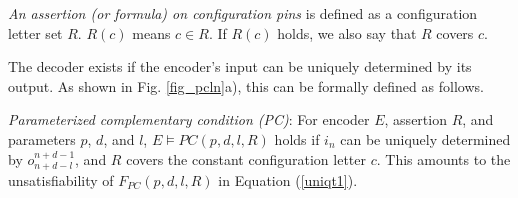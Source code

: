 \documentclass[journal]{IEEEtran}
\begin{document}


\emph{An assertion (or formula) on configuration pins} is defined as a configuration letter set $R$.
$R(c)$ means $c\in R$.
If $R(c)$ holds,
we also say that $R$ covers $c$.


The decoder exists if the encoder's input can be uniquely determined by its output.
As shown in Fig. \ref{fig_pcln}a),
this can be formally defined as follows.

\begin{definition11}\label{def_pcc}%
\emph{Parameterized complementary condition (PC)}:
For encoder $E$,
assertion $R$,
and parameters $p$, $d$, and $l$,
$E\vDash PC(p,d,l,R)$ holds if
$i_n$ can be uniquely determined by $o_{n+d-l}^{n+d-1}$,
and $R$ covers the constant configuration letter $c$.
This amounts to the unsatisfiability of $F_{PC}(p,d,l,R)$ in Equation (\ref{uniqt1}).
\end{definition11}
\end{document}
